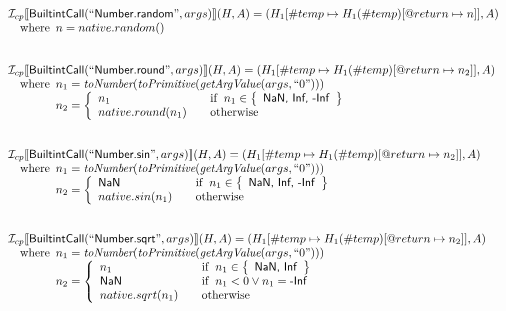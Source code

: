 \[\begin{array}{l}
\I _{cp}\lbr \SF{BuiltintCall}(``\SF{Number.random}",args)\rbr(H,A)
  = (H_1[\#temp \mapsto H_1(\#temp)[@return \mapsto n]], A)\\
\quad\wherec{
  n = native.random() 
  }\\
\\\\


\I _{cp}\lbr \SF{BuiltintCall}(``\SF{Number.round}",args)\rbr(H,A)
  = (H_1[\#temp \mapsto H_1(\#temp)[@return \mapsto n_2]], A)\\
\quad\wherec{
  n_1 = \hf{toNumber}(\hf{toPrimitive}(\hf{getArgValue}(args, ``0")))\\
  n_2 = \left\{
    \begin{array}{l@{\quad\quad}l}
       n_1 & \ifc{n_1 \in \set{\SF{NaN, Inf, -Inf}}}\\
      native.round(n_1) & \owc 
    \end{array}
  \right.
  }\\
\\\\


\I _{cp}\lbr \SF{BuiltintCall}(``\SF{Number.sin}",args)\rbr(H,A)
  = (H_1[\#temp \mapsto H_1(\#temp)[@return \mapsto n_2]], A)\\
\quad\wherec{
  n_1 = \hf{toNumber}(\hf{toPrimitive}(\hf{getArgValue}(args, ``0")))\\
  n_2 = \left\{
    \begin{array}{l@{\quad\quad}l}
      \SF{NaN} & \ifc{n_1 \in \set{\SF{NaN, Inf, -Inf}}}\\
      native.sin(n_1) & \owc 
    \end{array}
  \right.
  }\\
\\\\


\I _{cp}\lbr \SF{BuiltintCall}(``\SF{Number.sqrt}",args)\rbr(H,A)
  = (H_1[\#temp \mapsto H_1(\#temp)[@return \mapsto n_2]], A)\\
\quad\wherec{
  n_1 = \hf{toNumber}(\hf{toPrimitive}(\hf{getArgValue}(args, ``0")))\\
  n_2 = \left\{
    \begin{array}{l@{\quad\quad}l}
      n_1 & \ifc{n_1 \in \set{\SF{NaN, Inf}}}\\
      \SF{NaN} & \ifc{n_1<0 \lor n_1=\SF{-Inf}}\\
      native.sqrt(n_1) & \owc
    \end{array}
  \right.
  }\\
\\\\



\end{array}\]
